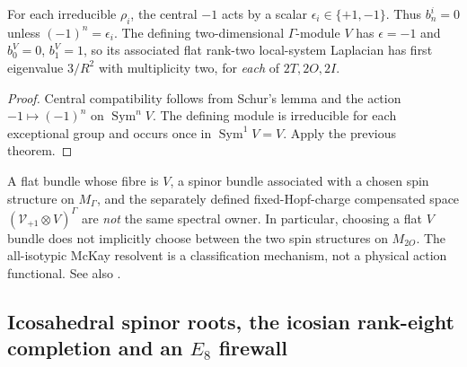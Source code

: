 \documentclass[11pt]{article}
\begin{document}
\begin{corollary}
\label{p1b:cor:v12-flat-parity}
For each irreducible $\rho_i$, the central $-1$ acts by a scalar
$\epsilon_i\in\{+1,-1\}$.  Thus $b_n^i=0$ unless
$(-1)^n=\epsilon_i$.  The defining two-dimensional
$\Gamma$-module $V$ has $\epsilon=-1$ and
$b_0^V=0$, $b_1^V=1$, so its associated flat rank-two local-system
Laplacian has first eigenvalue $3/R^2$ with multiplicity two,
for \emph{each} of $2T,2O,2I$.
\end{corollary}
\begin{proof}
Central compatibility follows from Schur's lemma and the action
$-1\mapsto(-1)^n$ on $\operatorname{Sym}^nV$.
The defining module is irreducible for each exceptional group and
occurs once in $\operatorname{Sym}^1V=V$.  Apply the previous theorem.
\end{proof}

\begin{remark}
\label{p1b:rem:v12-spin-owners}
A flat bundle whose fibre is $V$, a spinor bundle associated with a
chosen spin structure on $M_\Gamma$, and the separately defined
fixed-Hopf-charge compensated space
$(\mathcal V_{+1}\otimes V)^\Gamma$ are \emph{not} the same spectral
owner.  In particular, choosing a flat $V$ bundle does not
implicitly choose between the two spin structures on $M_{2O}$.
The all-isotypic McKay resolvent is a classification mechanism, not a
physical action functional.  See also
\cite{Suter2007QuantumAffine,BridgelandKingReid2001}.
\end{remark}

\subsection{Icosahedral spinor roots, the icosian rank-eight completion and an $E_8$ firewall}
\label{p1b:subsec:v12-icosian}
\end{document}
